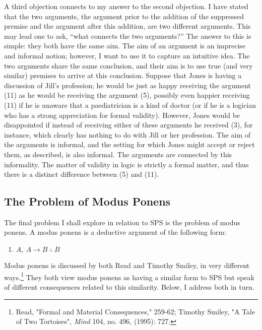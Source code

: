 A third objection connects to my answer to the second objection. I have
stated that the two arguments, the argument prior to the addition of the
suppressed premise and the argument after this addition, are two
different arguments. This may lead one to ask, ``what connects the two
arguments?'' The answer to this is simple: they both have the same aim.
The aim of an argument is an imprecise and informal notion; however, I
want to use it to capture an intuitive idea. The two arguments share the
same conclusion, and their aim is to use true (and very similar)
premises to arrive at this conclusion. Suppose that Jones is having a
discussion of Jill's profession; he would be just as happy receiving the
argument (11) as he would be receiving the argument (5), possibly even
happier receiving (11) if he is unaware that a paediatrician is a kind
of doctor (or if he is a logician who has a strong appreciation for
formal validity). However, Jones would be disappointed if instead of
receiving either of these arguments he received (3), for instance, which
clearly has nothing to do with Jill or her profession. The aim of the
arguments is informal, and the setting for which Jones might accept or
reject them, as described, is also informal. The arguments are connected
by this informality. The matter of validity in logic is strictly a
formal matter, and thus there is a distinct difference between (5) and
(11).

\subsection*{The Problem of Modus Ponens}

The final problem I shall explore in relation to SPS is the problem of
modus ponens. A modus ponens is a deductive argument of the following
form:

\begin{enumerate}[leftmargin=42pt] 
\def\labelenumi{(\arabic{enumi})}
\setcounter{enumi}{15}
\item
  $A, \ A \rightarrow B \ \therefore \ B$
\end{enumerate}

\noindent Modus ponens is discussed by both Read and Timothy Smiley, in very
different ways.\footnote{Read, "Formal and Material Consequences,"
  259-62; Timothy Smiley, "A Tale of Two Tortoises", \emph{Mind} 104,
  no. 496, (1995): 727.} They both view modus ponens as having a similar
form to SPS but speak of different consequences related to this
similarity. Below, I address both in turn.

